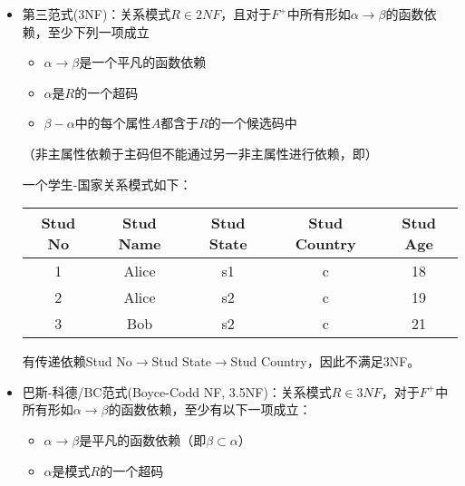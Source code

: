 \begin{itemize}
	\item 第三范式(3NF)：关系模式$R\in 2NF$，且对于$F^+$中所有形如$\alpha\to\beta$的函数依赖，至少下列一项成立
	\begin{itemize}
		\item $\alpha\to\beta$是一个平凡的函数依赖
		\item $\alpha$是$R$的一个超码
		\item $\beta-\alpha$中的每个属性$A$都含于$R$的一个候选码中
	\end{itemize}
	（非主属性依赖于主码但不能通过另一非主属性进行依赖，即）
	\begin{example}
	一个学生-国家关系模式如下：
	\begin{center}
	\begin{tabular}{ccccc}\hline
	Stud No & Stud Name & Stud State & Stud Country & Stud Age\\\hline
	1 & Alice & s1 & c & 18\\
	2 & Alice & s2 & c & 19\\
	3 & Bob & s2 & c & 21\\\hline
	\end{tabular}
	\end{center}
	有传递依赖Stud No$\to$Stud State$\to$Stud Country，因此不满足3NF。
	\end{example}

	\item 巴斯-科德/BC范式(Boyce-Codd NF, 3.5NF)：关系模式$R\in 3NF$，对于$F^+$中所有形如$\alpha\to\beta$的函数依赖，至少有以下一项成立：
	\begin{itemize}
		\item $\alpha\to\beta$是平凡的函数依赖（即$\beta\subset\alpha$）
		\item $\alpha$是模式$R$的一个超码
	\end{itemize}
\end{itemize}

